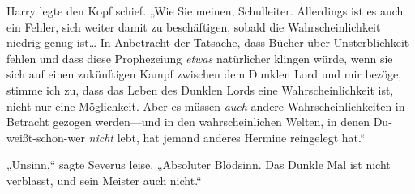 Harry legte den Kopf schief. „Wie Sie meinen, Schulleiter. Allerdings ist es auch ein Fehler, sich weiter damit zu beschäftigen, sobald die Wahrscheinlichkeit niedrig genug ist… In Anbetracht der Tatsache, dass Bücher über Unsterblichkeit fehlen und dass diese Prophezeiung \emph{etwas} natürlicher klingen würde, wenn sie sich auf einen zukünftigen Kampf zwischen dem Dunklen Lord und mir bezöge, stimme ich zu, dass das Leben des Dunklen Lords eine Wahrscheinlichkeit ist, nicht nur eine Möglichkeit. Aber es müssen \emph{auch} andere Wahrscheinlichkeiten in Betracht gezogen werden—und in den wahrscheinlichen Welten, in denen Du-weißt-schon-wer \emph{nicht} lebt, hat jemand anderes Hermine reingelegt hat.“

„Unsinn,“ sagte Severus leise. „Absoluter Blödsinn. Das Dunkle Mal ist nicht verblasst, und sein Meister auch nicht.“


